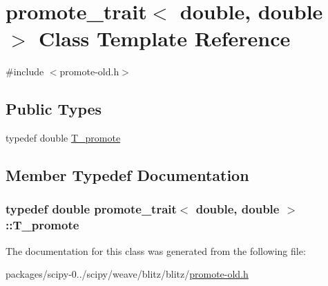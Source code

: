 \hypertarget{classpromote__trait_3_01double_00_01double_01_4}{}\section{promote\+\_\+trait$<$ double, double $>$ Class Template Reference}
\label{classpromote__trait_3_01double_00_01double_01_4}


{\ttfamily \#include $<$promote-\/old.\+h$>$}

\subsection*{Public Types}
\begin{DoxyCompactItemize}
\item 
typedef double \hyperlink{classpromote__trait_3_01double_00_01double_01_4_ae9de3a547702207cfb18fbbc3272821d}{T\+\_\+promote}
\end{DoxyCompactItemize}


\subsection{Member Typedef Documentation}
\hypertarget{classpromote__trait_3_01double_00_01double_01_4_ae9de3a547702207cfb18fbbc3272821d}{}
\subsubsection[{T\+\_\+promote}]{\setlength{\rightskip}{0pt plus 5cm}typedef double {\bf promote\+\_\+trait}$<$ double, double $>$\+::{\bf T\+\_\+promote}}\label{classpromote__trait_3_01double_00_01double_01_4_ae9de3a547702207cfb18fbbc3272821d}


The documentation for this class was generated from the following file\+:\begin{DoxyCompactItemize}
\item 
packages/scipy-\/0../scipy/weave/blitz/blitz/\hyperlink{promote-old_8h}{promote-\/old.\+h}\end{DoxyCompactItemize}
